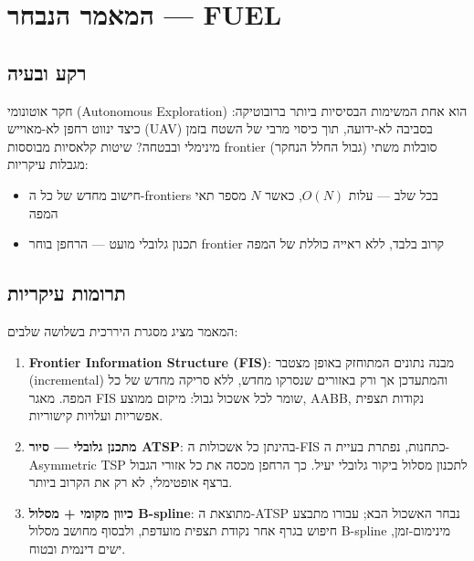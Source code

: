 \documentclass[11pt,a4paper]{article}
\begin{document}
\section{המאמר הנבחר — \textenglish{FUEL}}

\subsection{רקע ובעיה}

חקר אוטונומי (\textenglish{Autonomous Exploration}) הוא אחת המשימות הבסיסיות ביותר ברובוטיקה: כיצד ינווט רחפן לא-מאוייש (\textenglish{UAV}) בסביבה לא-ידועה, תוך כיסוי מרבי של השטח בזמן מינימלי ובבטחה? שיטות קלאסיות מבוססות \textenglish{frontier} (גבול החלל הנחקר) סובלות משתי מגבלות עיקריות:
\begin{itemize}
    \item חישוב מחדש של כל ה-\textenglish{frontiers} בכל שלב — עלות $O(N)$, כאשר $N$ מספר תאי המפה
    \item תכנון גלובלי מועט — הרחפן בוחר \textenglish{frontier} קרוב בלבד, ללא ראייה כוללת של המפה
\end{itemize}

\subsection{תרומות עיקריות}

המאמר מציג מסגרת היררכית בשלושה שלבים:
\begin{enumerate}
    \item \textbf{\textenglish{Frontier Information Structure (FIS)}}: מבנה נתונים המתוחזק באופן מצטבר (\textenglish{incremental}) והמתעדכן אך ורק באזורים שנסרקו מחדש, ללא סריקה מחדש של כל המפה. מאגר \textenglish{FIS} שומר לכל אשכול גבול: מיקום ממוצע, \textenglish{AABB}, נקודות תצפית אפשריות ועלויות קישוריות.

    \item \textbf{מתכנן גלובלי — סיור \textenglish{ATSP}}: בהינתן כל אשכולות ה-\textenglish{FIS} כתחנות, נפתרת בעיית ה-\textenglish{Asymmetric TSP} לתכנון מסלול ביקור גלובלי יעיל. כך הרחפן מכסה את כל אזורי הגבול ברצף אופטימלי, לא רק את הקרוב ביותר.

    \item \textbf{כיוון מקומי + מסלול \textenglish{B-spline}}: מתוצאת ה-\textenglish{ATSP} נבחר האשכול הבא; עבורו מתבצע חיפוש בגרף אחר נקודת תצפית מועדפת, ולבסוף מחושב מסלול \textenglish{B-spline} מינימום-זמן, ישים דינמית ובטוח.
\end{enumerate}
\end{document}
